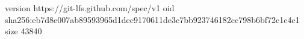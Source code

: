 version https://git-lfs.github.com/spec/v1
oid sha256:eb7d8e007ab89593965d1dec9170611de3c7bb923746182cc798b6bf72c1c4c1
size 43840
